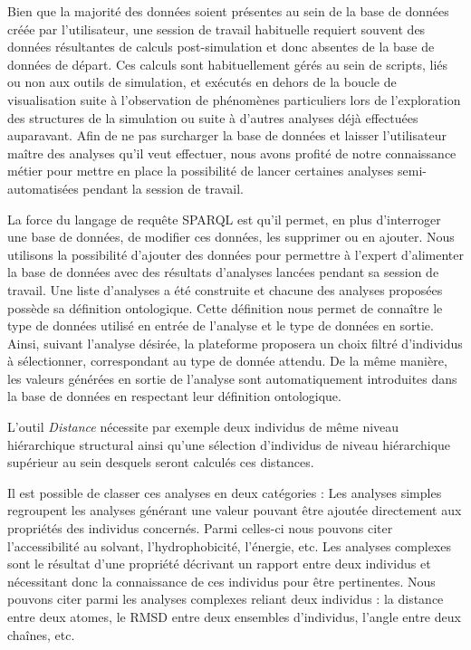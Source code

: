 Bien que la majorité des données soient présentes au sein de la base de données créée par l'utilisateur, une session de travail habituelle requiert souvent des données résultantes de calculs post-simulation et donc absentes de la base de données de départ. Ces calculs sont habituellement gérés au sein de scripts, liés ou non aux outils de simulation, et exécutés en dehors de la boucle de visualisation suite à l'observation de phénomènes particuliers lors de l'exploration des structures de la simulation ou suite à d'autres analyses déjà effectuées auparavant. Afin de ne pas surcharger la base de données et laisser l'utilisateur maître des analyses qu'il veut effectuer, nous avons profité de notre connaissance métier pour mettre en place la possibilité de lancer certaines analyses semi-automatisées pendant la session de travail. 

La force du langage de requête SPARQL est qu'il permet, en plus d'interroger une base de données, de modifier ces données, les supprimer ou en ajouter. Nous utilisons la possibilité d'ajouter des données pour permettre à l'expert d'alimenter la base de données avec des résultats d'analyses lancées pendant sa session de travail. Une liste d'analyses a été construite et chacune des analyses proposées possède sa définition ontologique. Cette définition nous permet de connaître le type de données utilisé en entrée de l'analyse et le type de données en sortie. Ainsi, suivant l'analyse désirée, la plateforme proposera un choix filtré d'individus à sélectionner, correspondant au type de donnée attendu. De la même manière, les valeurs générées en sortie de l'analyse sont automatiquement introduites dans la base de données en respectant leur définition ontologique.


L'outil \textit{Distance} nécessite par exemple deux individus de même niveau hiérarchique structural ainsi qu'une sélection d'individus de niveau hiérarchique supérieur au sein desquels seront calculés ces distances. 

Il est possible de classer ces analyses en deux catégories : Les analyses simples regroupent les analyses générant une valeur pouvant être ajoutée directement aux propriétés des individus concernés. Parmi celles-ci nous pouvons citer l'accessibilité au solvant, l'hydrophobicité, l'énergie, etc. 
Les analyses complexes sont le résultat d'une propriété décrivant un rapport entre deux individus et nécessitant donc la connaissance de ces individus pour être pertinentes. Nous pouvons citer parmi les analyses complexes reliant deux individus : la distance entre deux atomes, le RMSD entre deux ensembles d'individus, l'angle entre deux chaînes, etc.

